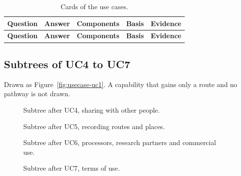 {\footnotesize
\begin{longtable}{@{}p{1.1cm}p{5.6cm}p{2.0cm}p{1.5cm}p{3.5cm}@{}}
\caption[Cards of the use cases]{Cards of the use cases.}
\label{tab:usecase-cards}\\
\toprule
\textbf{Question} & \textbf{Answer} & \textbf{Components} & \textbf{Basis} & \textbf{Evidence} \\
\midrule
\endfirsthead
\toprule
\textbf{Question} & \textbf{Answer} & \textbf{Components} & \textbf{Basis} & \textbf{Evidence} \\
\midrule
\endhead
\end{longtable}}

\subsection*{Subtrees of UC4 to UC7}
Drawn as Figure~\ref{fig:usecase-uc1}. A capability that gains only a route and no pathway is not
drawn.

\begin{figure}[H]
\centering

\caption[Subtree of UC4]{Subtree after UC4, sharing with other people.}
\label{fig:usecase-uc4}
\end{figure}

\begin{figure}[H]
\centering

\caption[Subtree of UC5]{Subtree after UC5, recording routes and places.}
\label{fig:usecase-uc5}
\end{figure}

\begin{figure}[H]
\centering

\caption[Subtree of UC6]{Subtree after UC6, processors, research partners and commercial use.}
\label{fig:usecase-uc6}
\end{figure}

\begin{figure}[H]
\centering

\caption[Subtree of UC7]{Subtree after UC7, terms of use.}
\label{fig:usecase-uc7}
\end{figure}
